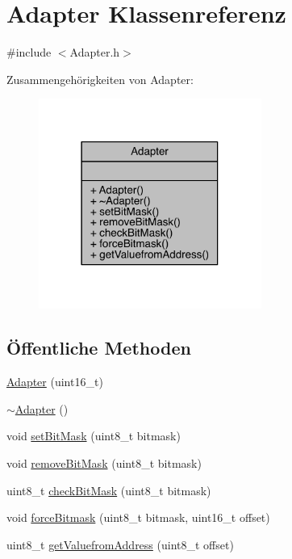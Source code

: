 \hypertarget{class_adapter}{}\section{Adapter Klassenreferenz}
\label{class_adapter}


{\ttfamily \#include $<$Adapter.\+h$>$}



Zusammengehörigkeiten von Adapter\+:\nopagebreak
\begin{figure}[H]
\begin{center}
\leavevmode
\includegraphics[width=207pt]{class_adapter__coll__graph}
\end{center}
\end{figure}
\subsection*{Öffentliche Methoden}
\begin{DoxyCompactItemize}
\item 
\hyperlink{class_adapter_ae2c6ad0390905b82cac4077642b36620}{Adapter} (uint16\+\_\+t)
\item 
\hyperlink{class_adapter_a08a07acff57eb40aba27455de23ed13c}{$\sim$\+Adapter} ()
\item 
void \hyperlink{class_adapter_adff950a92be7f52dbe08ff3af766a562}{set\+Bit\+Mask} (uint8\+\_\+t bitmask)
\item 
void \hyperlink{class_adapter_a655de45764223d7b1b3847170cc405a5}{remove\+Bit\+Mask} (uint8\+\_\+t bitmask)
\item 
uint8\+\_\+t \hyperlink{class_adapter_a8b1478082798b063a0c04d98fdea06a2}{check\+Bit\+Mask} (uint8\+\_\+t bitmask)
\item 
void \hyperlink{class_adapter_afc0aa429b5f6cdd52a7e78045b3c459c}{force\+Bitmask} (uint8\+\_\+t bitmask, uint16\+\_\+t offset)
\item 
uint8\+\_\+t \hyperlink{class_adapter_af8b131f521892341ff7a2959bf56e004}{get\+Valuefrom\+Address} (uint8\+\_\+t offset)
\end{DoxyCompactItemize}


